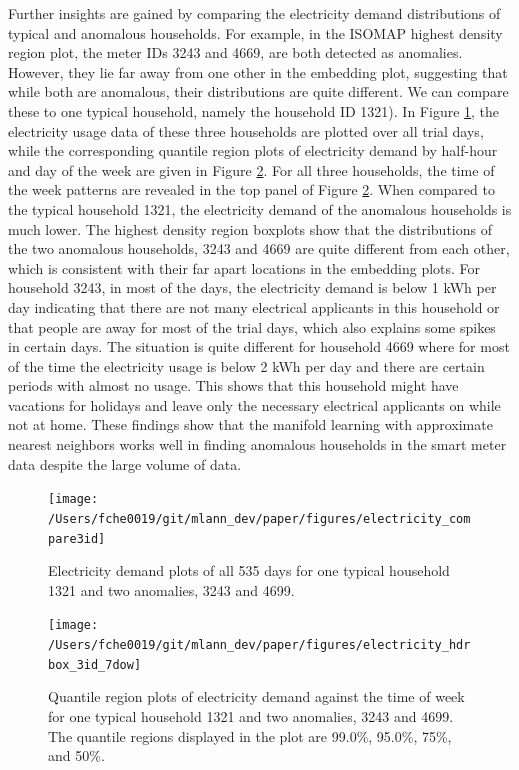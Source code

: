 \documentclass[11pt,a4paper,]{article}
\begin{document}
Further insights are gained by comparing the electricity demand distributions of typical and anomalous households. For example, in the ISOMAP highest density region plot, the meter IDs 3243 and 4669, are both detected as anomalies. However, they lie far away from one other in the embedding plot, suggesting that while both are anomalous, their distributions are quite different. We can compare these to one typical household, namely the household ID 1321). In Figure \ref{fig:compare3ids}, the electricity usage data of these three households are plotted over all trial days, while the corresponding quantile region plots of electricity demand by half-hour and day of the week are given in Figure \ref{fig:hdrboxplot3ids}. For all three households, the time of the week patterns are revealed in the top panel of Figure \ref{fig:hdrboxplot3ids}. When compared to the typical household 1321, the electricity demand of the anomalous households is much lower. The highest density region boxplots show that the distributions of the two anomalous households, 3243 and 4669 are quite different from each other, which is consistent with their far apart locations in the embedding plots. For household 3243, in most of the days, the electricity demand is below 1 kWh per day indicating that there are not many electrical applicants in this household or that people are away for most of the trial days, which also explains some spikes in certain days. The situation is quite different for household 4669 where for most of the time the electricity usage is below 2 kWh per day and there are certain periods with almost no usage. This shows that this household might have vacations for holidays and leave only the necessary electrical applicants on while not at home. These findings show that the manifold learning with approximate nearest neighbors works well in finding anomalous households in the smart meter data despite the large volume of data.

\begin{figure}

{\centering \texttt{[image: /Users/fche0019/git/mlann\_dev/paper/figures/electricity\_compare3id]} 

}

\caption{Electricity demand plots of all 535 days for one typical household 1321 and two anomalies, 3243 and 4699. }\label{fig:compare3ids}
\end{figure}
\begin{figure}

{\centering \texttt{[image: /Users/fche0019/git/mlann\_dev/paper/figures/electricity\_hdrbox\_3id\_7dow]} 

}

\caption{Quantile region plots of electricity demand against the time of week for one typical household 1321 and two anomalies, 3243 and 4699. The quantile regions displayed in the plot are 99.0\%, 95.0\%, 75\%, and 50\%. }\label{fig:hdrboxplot3ids}
\end{figure}
\end{document}
